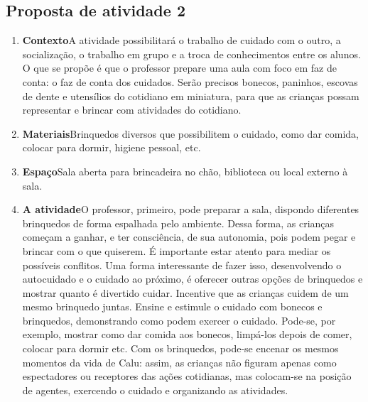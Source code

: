 \documentclass[11pt]{extarticle}
\begin{document}
\subsection{Proposta de atividade 2}


\begin{enumerate}
\item \textbf{Contexto}\quad A atividade possibilitará o trabalho de cuidado com o outro, a socialização, o trabalho em grupo e a troca de conhecimentos entre os alunos. O que se propõe é que o professor prepare uma aula com foco em faz de conta: o faz de conta dos cuidados. Serão precisos bonecos, paninhos, escovas de dente e utensílios do cotidiano em miniatura, para que as crianças possam representar e brincar com atividades do cotidiano.  

\item \textbf{Materiais}\quad Brinquedos diversos que possibilitem o cuidado, como dar comida, colocar para dormir, higiene pessoal, etc.

\item \textbf{Espaço}\quad Sala aberta para brincadeira no chão, biblioteca ou local externo à sala.

\item \textbf{A atividade}\quad O professor, primeiro, pode preparar a sala, dispondo diferentes brinquedos de forma espalhada pelo ambiente. Dessa forma, as crianças começam a ganhar, e ter consciência, de sua autonomia, pois podem pegar e  brincar com o que quiserem. É importante estar atento para mediar os possíveis conflitos. Uma forma interessante de fazer isso, desenvolvendo o autocuidado e o cuidado ao próximo, é oferecer outras opções de brinquedos e mostrar quanto é divertido cuidar. Incentive que as crianças cuidem de um mesmo brinquedo juntas. Ensine e estimule o cuidado com bonecos e brinquedos, demonstrando como podem exercer o cuidado. Pode-se, por exemplo, mostrar como dar comida aos bonecos, limpá-los depois de comer, colocar para dormir etc. Com os brinquedos, pode-se encenar os mesmos momentos da vida de Calu: assim, as crianças não figuram apenas como espectadores ou receptores das ações cotidianas, mas colocam-se na posição de agentes, exercendo o cuidado e organizando as atividades.



\end{enumerate}
\end{document}
